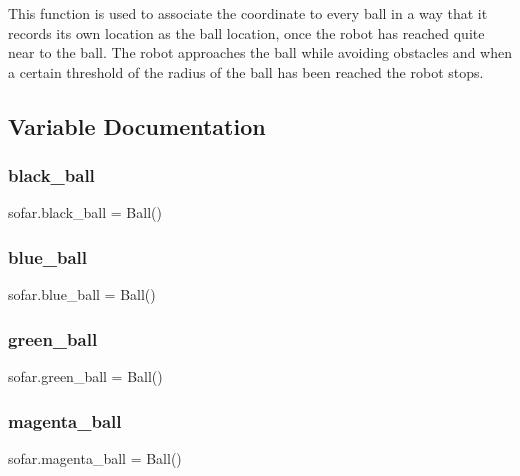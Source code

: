 \begin{DoxyVerb}This function is used to associate the coordinate to every ball in a way that it records its own location as the ball location, once the robot has reached quite near to the ball. The robot approaches the ball while avoiding obstacles and when a certain threshold of the radius of the ball has been reached the robot stops.  
\end{DoxyVerb}
 

\subsection{Variable Documentation}
\mbox{\label{namespacesofar_a2428f1093186867d48b4347c3ca7e309}} 
\subsubsection{\texorpdfstring{black\+\_\+ball}{black\_ball}}
{\footnotesize\ttfamily sofar.\+black\+\_\+ball = Ball()}

\mbox{\label{namespacesofar_a71e03d466d0c78fd44668097cc2a933a}} 
\subsubsection{\texorpdfstring{blue\+\_\+ball}{blue\_ball}}
{\footnotesize\ttfamily sofar.\+blue\+\_\+ball = Ball()}

\mbox{\label{namespacesofar_afc01234c38100dadc0f39a7b337a1f07}} 
\subsubsection{\texorpdfstring{green\+\_\+ball}{green\_ball}}
{\footnotesize\ttfamily sofar.\+green\+\_\+ball = Ball()}

\mbox{\label{namespacesofar_a91e20c53c4643e89b91d7fc7b8607af8}} 
\subsubsection{\texorpdfstring{magenta\+\_\+ball}{magenta\_ball}}
{\footnotesize\ttfamily sofar.\+magenta\+\_\+ball = Ball()}

